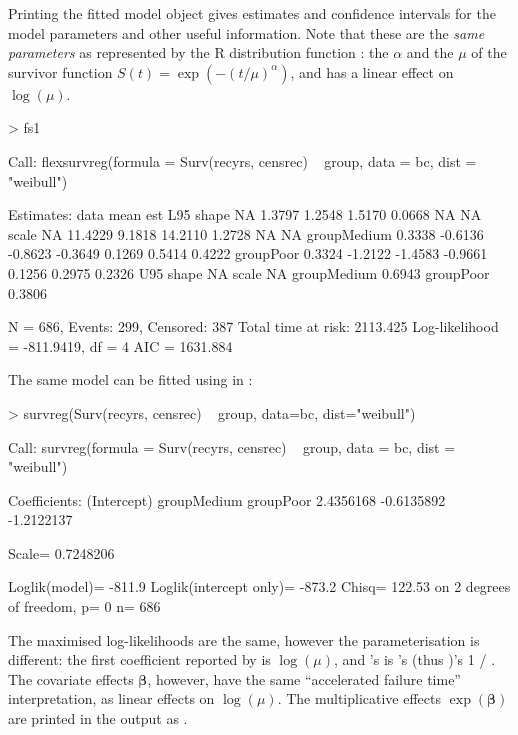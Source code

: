 \documentclass[nojss,nofooter]{jss}
\begin{document}
Printing the fitted model object gives estimates and confidence
intervals for the model parameters and other useful information.  Note
that these are the \emph{same parameters} as represented by the R
distribution function : the  $\alpha$ and
the  $\mu$ of the survivor function $S(t) =
\exp(-(t/\mu)^\alpha)$, and  has a linear effect on
$\log(\mu)$.
\begin{Schunk}
\begin{Sinput}
> fs1
\end{Sinput}
\begin{Soutput}
Call:
flexsurvreg(formula = Surv(recyrs, censrec) ~ group, data = bc,     dist = "weibull")

Estimates: 
             data mean  est      L95%
shape             NA     1.3797   1.2548   1.5170   0.0668       NA        NA
scale             NA    11.4229   9.1818  14.2110   1.2728       NA        NA
groupMedium   0.3338    -0.6136  -0.8623  -0.3649   0.1269   0.5414    0.4222
groupPoor     0.3324    -1.2122  -1.4583  -0.9661   0.1256   0.2975    0.2326
             U95%
shape             NA
scale             NA
groupMedium   0.6943
groupPoor     0.3806

N = 686,  Events: 299,  Censored: 387
Total time at risk: 2113.425
Log-likelihood = -811.9419, df = 4
AIC = 1631.884
\end{Soutput}
\end{Schunk}
The same model can be fitted using  in 
:
\begin{Schunk}
\begin{Sinput}
> survreg(Surv(recyrs, censrec) ~ group, data=bc, dist="weibull")
\end{Sinput}
\begin{Soutput}
Call:
survreg(formula = Surv(recyrs, censrec) ~ group, data = bc, dist = "weibull")

Coefficients:
(Intercept) groupMedium   groupPoor 
  2.4356168  -0.6135892  -1.2122137 

Scale= 0.7248206 

Loglik(model)= -811.9   Loglik(intercept only)= -873.2
	Chisq= 122.53 on 2 degrees of freedom, p= 0 
n= 686 
\end{Soutput}
\end{Schunk}
The maximised log-likelihoods are the same, however the
parameterisation is different: the first coefficient
 reported by  is $\log(\mu)$, and
's  is 's (thus
)'s 1 / . The covariate effects
$\bm{\beta}$, however, have the same ``accelerated failure time''
interpretation, as linear effects on $\log(\mu)$.  The multiplicative
effects $\exp(\bm{\beta})$ are printed in the output as
.
\end{document}

